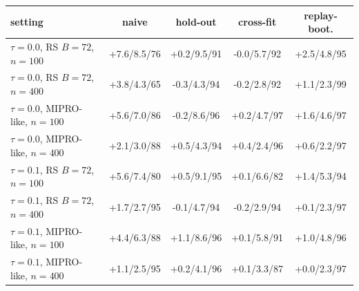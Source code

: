 \begin{tabular}{lcccc}
\toprule
setting & naive & hold-out & cross-fit & replay-boot. \\
\midrule
$\tau{=}0.0$, RS $B{=}72$, $n{=}100$ & +7.6/8.5/76 & +0.2/9.5/91 & -0.0/5.7/92 & +2.5/4.8/95 \\
$\tau{=}0.0$, RS $B{=}72$, $n{=}400$ & +3.8/4.3/65 & -0.3/4.3/94 & -0.2/2.8/92 & +1.1/2.3/99 \\
$\tau{=}0.0$, MIPRO-like, $n{=}100$ & +5.6/7.0/86 & -0.2/8.6/96 & +0.2/4.7/97 & +1.6/4.6/97 \\
$\tau{=}0.0$, MIPRO-like, $n{=}400$ & +2.1/3.0/88 & +0.5/4.3/94 & +0.4/2.4/96 & +0.6/2.2/97 \\
$\tau{=}0.1$, RS $B{=}72$, $n{=}100$ & +5.6/7.4/80 & +0.5/9.1/95 & +0.1/6.6/82 & +1.4/5.3/94 \\
$\tau{=}0.1$, RS $B{=}72$, $n{=}400$ & +1.7/2.7/95 & -0.1/4.7/94 & -0.2/2.9/94 & +0.1/2.3/97 \\
$\tau{=}0.1$, MIPRO-like, $n{=}100$ & +4.4/6.3/88 & +1.1/8.6/96 & +0.1/5.8/91 & +1.0/4.8/96 \\
$\tau{=}0.1$, MIPRO-like, $n{=}400$ & +1.1/2.5/95 & +0.2/4.1/96 & +0.1/3.3/87 & +0.0/2.3/97 \\
\bottomrule
\end{tabular}
